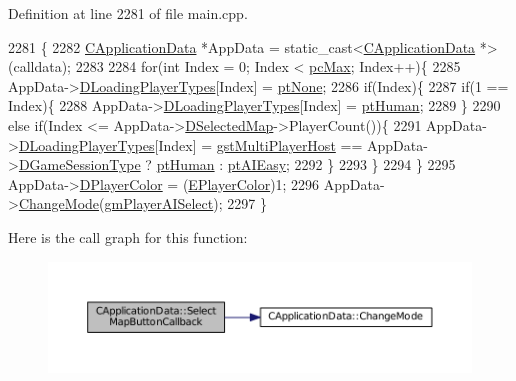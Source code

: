 Definition at line 2281 of file main.\+cpp.


\begin{DoxyCode}
2281                                                             \{
2282     \hyperlink{classCApplicationData}{CApplicationData} *AppData = \textcolor{keyword}{static\_cast<}\hyperlink{classCApplicationData}{CApplicationData} *\textcolor{keyword}{>}(calldata);
2283  
2284     \textcolor{keywordflow}{for}(\textcolor{keywordtype}{int} Index = 0; Index < \hyperlink{GameDataTypes_8h_aafb0ca75933357ff28a6d7efbdd7602fa594a5c8dd3987f24e8a0f23f1a72cd34}{pcMax}; Index++)\{
2285         AppData->\hyperlink{classCApplicationData_a2ac5711b027842d57aa5f8e5a7adc589}{DLoadingPlayerTypes}[Index] = \hyperlink{classCApplicationData_ae04b6b340297311972ce1e955196fcaaa091de1adaa447ed15f9f6bb25f0880f7}{ptNone};
2286         \textcolor{keywordflow}{if}(Index)\{
2287             \textcolor{keywordflow}{if}(1 == Index)\{
2288                 AppData->\hyperlink{classCApplicationData_a2ac5711b027842d57aa5f8e5a7adc589}{DLoadingPlayerTypes}[Index] = \hyperlink{classCApplicationData_ae04b6b340297311972ce1e955196fcaaaf06f9bc64db8860bc03ecc330b11f234}{ptHuman};
2289             \}
2290             \textcolor{keywordflow}{else} \textcolor{keywordflow}{if}(Index <= AppData->\hyperlink{classCApplicationData_abf74a18394e479b7090a8f9a55608867}{DSelectedMap}->PlayerCount())\{
2291                 AppData->\hyperlink{classCApplicationData_a2ac5711b027842d57aa5f8e5a7adc589}{DLoadingPlayerTypes}[Index] = 
      \hyperlink{classCApplicationData_a0ec00515bf6b4b469b43ad62d615e3faa9ce51c30b802a2fc5f1c587829b20673}{gstMultiPlayerHost} == AppData->\hyperlink{classCApplicationData_acd2cc6f5bbb325532c21afc38241c3de}{DGameSessionType} ?  
      \hyperlink{classCApplicationData_ae04b6b340297311972ce1e955196fcaaaf06f9bc64db8860bc03ecc330b11f234}{ptHuman} : \hyperlink{classCApplicationData_ae04b6b340297311972ce1e955196fcaaa94da5a073589347212dc8f08c02a17a5}{ptAIEasy};
2292             \}
2293         \}
2294     \}
2295     AppData->\hyperlink{classCApplicationData_a53550939b20cba70570f113e4d1c5d02}{DPlayerColor} = (\hyperlink{GameDataTypes_8h_aafb0ca75933357ff28a6d7efbdd7602f}{EPlayerColor})1;
2296     AppData->\hyperlink{classCApplicationData_aee18c113e9a0acb3cad3d63eb19de71b}{ChangeMode}(\hyperlink{classCApplicationData_ac8ac37a4c8bb871036fbbdc6a072e403a01258bbe3c3588b79ba150d1106b34b9}{gmPlayerAISelect});
2297 \}
\end{DoxyCode}
Here is the call graph for this function\+:\nopagebreak
\begin{figure}[H]
\begin{center}
\leavevmode
\includegraphics[width=350pt]{classCApplicationData_a5f915dc03205b67ca79f4dcfd7b43f5a_cgraph}
\end{center}
\end{figure}
